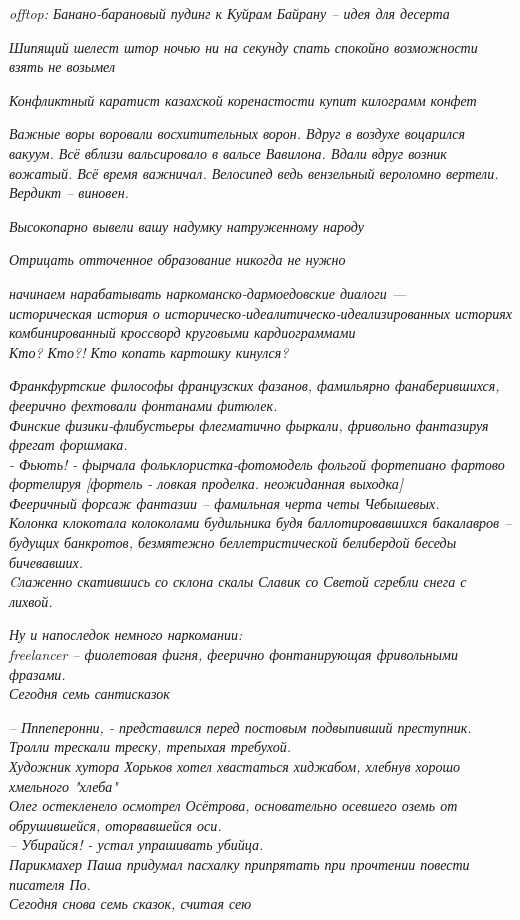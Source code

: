 \begin{flushleft}
    \emph{offtop: Банано-барановый пудинг к Куйрам Байрану -- идея для десерта}

    \emph{Шипящий шелест штор ночью ни на секунду спать спокойно возможности взять не возымел}

    \emph{Конфликтный каратист казахской коренастости купит килограмм конфет}

    \emph{Важные воры воровали восхитительных ворон. Вдруг в воздухе воцарился вакуум.
    Всё вблизи вальсировало в вальсе Вавилона. Вдали вдруг возник вожатый. Всё время важничал.
    Велосипед ведь вензельный вероломно вертели.\\
    Вердикт -- виновен.}

    \emph{Высокопарно вывели вашу надумку натруженному народу}

    \emph{Отрицать отточенное образование никогда не нужно}

    \emph{начинаем нарабатывать наркоманско-дармоедовские диалоги ---\\
    историческая история о историческо-идеалитическо-идеализированных историях\\
    комбинированный кроссворд круговыми кардиограммами\\
    Кто? Кто?! Кто копать картошку кинулся?}

    \emph{Франкфуртские философы французских фазанов, фамильярно фанаберившихся, феерично фехтовали фонтанами фитюлек.\\
    Финские физики-флибустьеры флегматично фыркали, фривольно фантазируя фрегат форшмака.\\
    - Фьють! - фырчала фольклористка-фотомодель фольгой фортепиано фартово фортелируя 
        [фортель - ловкая проделка. неожиданная выходка]\\
    Фееричный форсаж фантазии -- фамильная черта четы Чебышевых.\\
    Колонка клокотала колоколами будильника будя баллотировавшихся бакалавров -- будущих банкротов, безмятежно беллетристической белибердой беседы бичевавших.\\
    Cлаженно скатившись со склона скалы Славик со Светой сгребли снега с лихвой.}

    \emph{Ну и напоследок немного наркомании:\\
    freelancer -- фиолетовая фигня, феерично фонтанирующая фривольными фразами.\\
    Сегодня семь сантисказок}

    \emph{-- Пппеперонни, - представился перед постовым подвыпивший преступник.\\
    Тролли трескали треску, трепыхая требухой.\\
    Художник хутора Хорьков хотел хвастаться хиджабом, хлебнув хорошо хмельного "хлеба"\\
    Олег остекленело осмотрел Осётрова, основательно осевшего оземь от обрушившейся, оторвавшейся оси.\\
    -- Убирайся! - устал упрашивать убийца.\\
    Парикмахер Паша придумал пасхалку припрятать при прочтении повести писателя По.\\
    Сегодня снова семь сказок, считая сею}


\end{flushleft}

